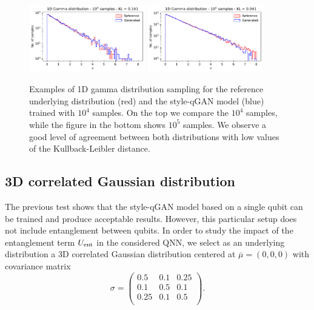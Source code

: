 \documentclass[twocolumn,preprintnumbers,superscriptaddress]{revtex4-2}
\begin{document}
\begin{figure}
  \includegraphics[width=0.45\textwidth]{plots/1Dgamma/1Dgamma_distribution_10k.pdf}
  \includegraphics[width=0.45\textwidth]{plots/1Dgamma/1Dgamma_distribution_100k.pdf}
  \caption{\label{fig:gamma} Examples of 1D gamma distribution sampling for the
  reference underlying distribution (red) and the style-qGAN model (blue) trained with
  $10^4$ samples. On the top we compare the $10^4$ samples, while the figure in
  the bottom shows $10^5$ samples. We observe a good level of agreement between
  both distributions with low values of the Kullback-Leibler distance.}
\end{figure}

\subsection{3D correlated Gaussian distribution}

The previous test shows that the style-qGAN model based on a single qubit can be
trained and produce acceptable results. However, this particular setup does not
include entanglement between qubits. In order to study the impact of the
entanglement term $U_{\rm ent}$ in the considered QNN, we select as an
underlying distribution a 3D correlated Gaussian distribution centered at
$\overline{\mu}=(0,0,0)$ with covariance matrix
\begin{equation}
  \sigma =
\begin{pmatrix}
  0.5 & 0.1 & 0.25\\
  0.1 & 0.5 & 0.1\\
  0.25 & 0.1 & 0.5\\
  \end{pmatrix}.
\end{equation}
\end{document}
